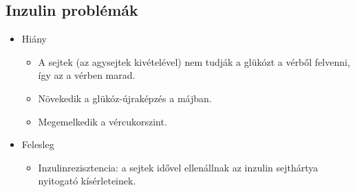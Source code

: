 \subsection{Inzulin problémák}
\begin{itemize}
    \item Hiány
    \begin{itemize}
        \item A sejtek (az agysejtek kivételével) nem tudják a glükózt a vérből felvenni, így az a vérben marad.
        \item Növekedik a glükóz-újraképzés a májban.
        \item Megemelkedik a vércukorszint.
    \end{itemize}
    \item Felesleg
    \begin{itemize}
        \item Inzulinrezisztencia: a sejtek idővel ellenállnak az inzulin sejthártya nyitogató kísérleteinek.
    \end{itemize}
\end{itemize}

